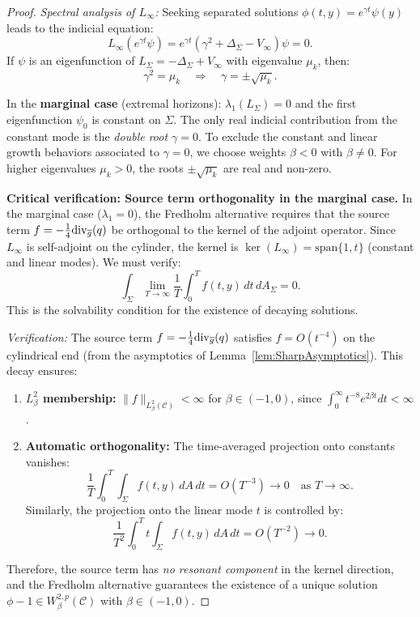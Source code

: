 \begin{proof}
\textit{Spectral analysis of $L_\infty$:}
Seeking separated solutions $\phi(t,y) = e^{\gamma t} \psi(y)$ leads to the indicial equation:
\[
    L_\infty(e^{\gamma t} \psi) = e^{\gamma t} \left( \gamma^2 + \Delta_\Sigma - V_\infty \right) \psi = 0.
\]
If $\psi$ is an eigenfunction of $L_\Sigma = -\Delta_\Sigma + V_\infty$ with eigenvalue $\mu_k$, then:
\[
    \gamma^2 = \mu_k \quad \Rightarrow \quad \gamma = \pm \sqrt{\mu_k}.
\]

In the \textbf{marginal case} (extremal horizons): $\lambda_1(L_\Sigma) = 0$ and the first eigenfunction $\psi_0$ is constant on $\Sigma$. The only real indicial contribution from the constant mode is the \emph{double root $\gamma=0$}. To exclude the constant and linear growth behaviors associated to $\gamma=0$, we choose weights $\beta<0$ with $\beta\ne 0$. For higher eigenvalues $\mu_k > 0$, the roots $\pm\sqrt{\mu_k}$ are real and non-zero.

\textbf{Critical verification: Source term orthogonality in the marginal case.}
In the marginal case ($\lambda_1 = 0$), the Fredholm alternative requires that the source term $f = -\frac{1}{4}\mathrm{div}_{\overline{g}}(q)$ be orthogonal to the kernel of the adjoint operator. Since $L_\infty$ is self-adjoint on the cylinder, the kernel is $\ker(L_\infty) = \mathrm{span}\{1, t\}$ (constant and linear modes). We must verify:
\begin{equation}\label{eq:SourceOrthogonality}
    \int_\Sigma \lim_{T \to \infty} \frac{1}{T} \int_0^T f(t, y) \, dt \, dA_\Sigma = 0.
\end{equation}
This is the solvability condition for the existence of decaying solutions.

\textit{Verification:} The source term $f = -\frac{1}{4}\mathrm{div}_{\overline{g}}(q)$ satisfies $f = O(t^{-4})$ on the cylindrical end (from the asymptotics of Lemma~\ref{lem:SharpAsymptotics}). This decay ensures:
\begin{enumerate}
    \item[(i)] \textbf{$L^2_\beta$ membership:} $\|f\|_{L^2_\beta(\mathcal{C})} < \infty$ for $\beta \in (-1, 0)$, since $\int_0^\infty t^{-8} e^{2\beta t} dt < \infty$.
    \item[(ii)] \textbf{Automatic orthogonality:} The time-averaged projection onto constants vanishes:
    \begin{equation}
        \frac{1}{T} \int_0^T \int_\Sigma f(t,y) \, dA \, dt = O(T^{-3}) \to 0 \quad \text{as } T \to \infty.
    \end{equation}
    Similarly, the projection onto the linear mode $t$ is controlled by:
    \begin{equation}
        \frac{1}{T^2} \int_0^T t \int_\Sigma f(t,y) \, dA \, dt = O(T^{-2}) \to 0.
    \end{equation}
\end{enumerate}
Therefore, the source term has \emph{no resonant component} in the kernel direction, and the Fredholm alternative guarantees the existence of a unique solution $\phi - 1 \in W^{2,p}_\beta(\mathcal{C})$ with $\beta \in (-1, 0)$.


\end{proof}
